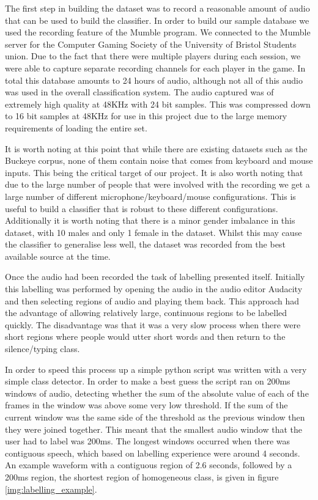 \documentclass[ %
                    author={Sam Phippen},
                supervisor={Dr. Rafal Bogacz},
                     title={Real time voice activity detectors in noisy personal computing environments},
                  subtitle={},
                    degree={MEng},
                      year={2012} ]{thesis}
\begin{document}
The first step in building the dataset was to record a reasonable amount of
audio that can be used to build the classifier. In order to build our sample
database we used the recording feature of the Mumble\cite{mumble} program. We
connected to the Mumble server for the Computer Gaming Society of the University of
Bristol Students union. Due to the fact that there were multiple players during
each session, we were able to capture separate recording channels for each
player in the game. In total this database amounts to 24 hours of audio,
although not all of this audio was used in the overall classification system.
The audio captured was of extremely high quality at 48KHz with 24 bit samples.
This was compressed down to 16 bit samples at 48KHz for use in this project due
to the large memory requirements of loading the entire set.

It is worth noting at this point that while there are existing datasets such as
the Buckeye corpus\cite{buckeye}, none of them contain noise that comes from
keyboard and mouse inputs. This being the critical target of our project. It is
also worth noting that due to the large number of people that were involved
with the recording we get a large number of different microphone/keyboard/mouse
configurations. This is useful to build a classifier that is robust to these
different configurations. Additionally it is worth noting that there is a minor
gender imbalance in this dataset, with 10 males and only 1 female in the
dataset. Whilst this may cause the classifier to generalise less well, the
dataset was recorded from the best available source at the time.

Once the audio had been recorded the task of labelling presented itself.
Initially this labelling was performed by opening the audio in the audio editor
Audacity\cite{audacity} and then selecting regions of audio and playing them
back. This approach had the advantage of allowing relatively large, continuous
regions to be labelled quickly. The disadvantage was that it was a very slow
process when there were short regions where people would utter short words and
then return to the silence/typing class.

In order to speed this process up a simple python script was written with a
very simple class detector. In order to make a best guess the script ran on
200ms windows of audio, detecting whether the sum of the absolute value of each
of the frames in the window was above some very low threshold. If the sum of
the current window was the same side of the threshold as the previous window
then they were joined together. This meant that the smallest audio window that
the user had to label was 200ms. The longest windows occurred when there was
contiguous speech, which based on labelling experience were around 4 seconds.
An example waveform with a contiguous region of 2.6 seconds, followed by a
200ms region, the shortest region of homogeneous class, is given in figure
\ref{img:labelling_example}.
\end{document}
